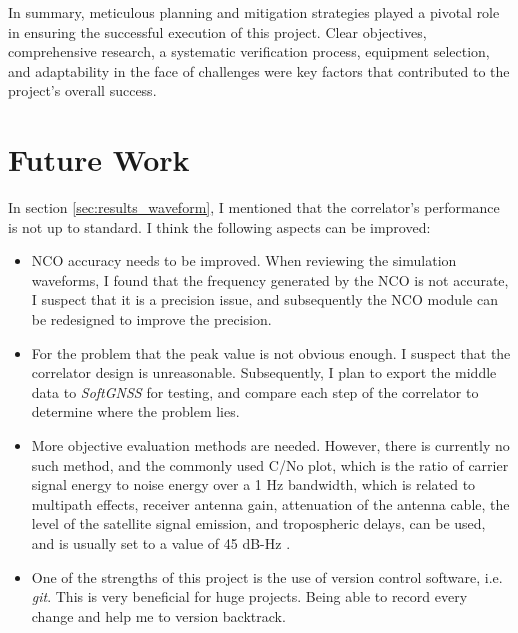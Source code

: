 
In summary, meticulous planning and mitigation strategies played a pivotal role in ensuring the successful execution of this project. Clear objectives, comprehensive research, a systematic verification process, equipment selection, and adaptability in the face of challenges were key factors that contributed to the project's overall success.

\section{Future Work}
In section \ref{sec:results_waveform}, I mentioned that the correlator's performance is not up to standard. I think the following aspects can be improved:

\begin{itemize}
    \item NCO accuracy needs to be improved. When reviewing the simulation waveforms, I found that the frequency generated by the NCO is not accurate, I suspect that it is a precision issue, and subsequently the NCO module can be redesigned to improve the precision.
    \item For the problem that the peak value is not obvious enough. I suspect that the correlator design is unreasonable. Subsequently, I plan to export the middle data to \textit{SoftGNSS} for testing, and compare each step of the correlator to determine where the problem lies.
    \item More objective evaluation methods are needed. However, there is currently no such method, and the commonly used C/No plot, which is the ratio of carrier signal energy to noise energy over a 1 Hz bandwidth, which is related to multipath effects, receiver antenna gain, attenuation of the antenna cable, the level of the satellite signal emission, and tropospheric delays, can be used, and is usually set to a value of 45 dB-Hz \cite{RN211}.
    \item One of the strengths of this project is the use of version control software, i.e. \textit{git}. This is very beneficial for huge projects. Being able to record every change and help me to version backtrack.
\end{itemize}
